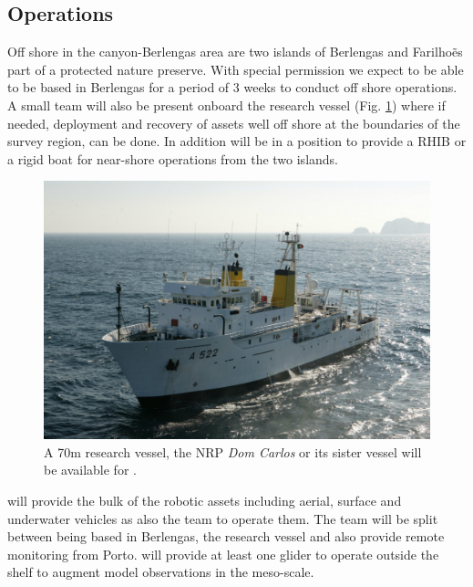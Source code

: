 \subsection{\proj Operations}
 

Off shore in the \naz canyon-Berlengas area are two islands of Berlengas
and Farilho\~es part of a protected nature preserve. With special
permission we expect to be able to be based in Berlengas for a period of
3 weeks to conduct off shore operations. A small team will also be
present onboard the \inst research vessel (Fig. \ref{fig:vessel}) where
if needed, deployment and recovery of assets well off shore at the
boundaries of the survey region, can be done. In addition \inst will be
in a position to provide a RHIB or a rigid boat for near-shore
operations from the two islands.

\begin{figure}
  \centering
  \includegraphics[scale=1.75]{fig/dom-carlos.jpg}
  \caption{A 70m research vessel, the NRP \emph{Dom Carlos} or its
    sister vessel will be available for \proje.}
 \label{fig:vessel}
\end{figure}


\univ will provide the bulk of the robotic assets including aerial,
surface and underwater vehicles as also the team to operate them. The
team will be split between being based in Berlengas, the research vessel
and also provide remote monitoring from Porto. \soc will provide at
least one glider to operate outside the shelf to augment model
observations in the meso-scale.

